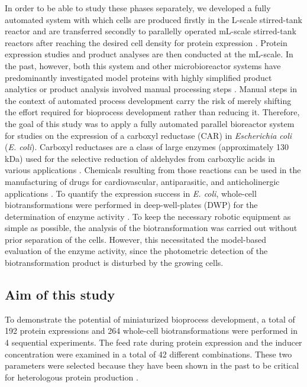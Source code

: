 \documentclass[sn-standardnature]{sn-jnl}%
\theoremstyle{thmstyleone}%
\theoremstyle{thmstyletwo}%
\theoremstyle{thmstylethree}%
\begin{document}
In order to be able to study these phases separately, we developed a fully automated system with which cells are produced firstly in the L-scale stirred-tank reactor and are transferred secondly to parallelly operated mL-scale stirred-tank reactors after reaching the desired cell density for protein expression \cite{von2021automated}.
Protein expression studies and product analyses are then conducted at the mL-scale.
In the past, however, both this system and other microbioreactor systems have predominantly investigated model proteins with highly simplified product analytics \cite{schmideder2017high,von2021automated,huber2009robo} or product analysis involved manual processing steps \cite{haby2019integrated}.
Manual steps in the context of automated process development carry the risk of merely shifting the effort required for bioprocess development rather than reducing it.
Therefore, the goal of this study was to apply a fully automated parallel bioreactor system for studies on the expression of a carboxyl reductase (CAR) in \textit{Escherichia coli} (\textit{E. coli}).
Carboxyl reductases are a class of large enzymes (approximately 130 kDa) used for the selective reduction of aldehydes from carboxylic acids in various applications \cite{weber2021production}.
Chemicals resulting from those reactions can be used in the manufacturing of drugs for cardiovascular, antiparasitic, and anticholinergic applications \cite{erdmann2017enzymatic,weber2021production,ruff2012biocatalytic}.
To quantify the expression success in \textit{E. coli}, whole-cell biotransformations were performed in deep-well-plates (DWP) for the determination of enzyme activity \cite{schwendenwein2019random}.
To keep the necessary robotic equipment as simple as possible, the analysis of the biotransformation was carried out without prior separation of the cells.
However, this necessitated the model-based evaluation of the enzyme activity, since the photometric detection of the biotransformation product is disturbed by the growing cells.

\subsection{Aim of this study}
\label{sec_intro_aim}

To demonstrate the potential of miniaturized bioprocess development, a total of 192 protein expressions and 264 whole-cell biotransformations were performed in 4 sequential experiments.
The feed rate during protein expression and the inducer concentration were examined in a total of 42 different combinations.
These two parameters were selected because they have been shown in the past to be critical for heterologous protein production \cite{neubauer2001expression,von2021automated}.
\end{document}

